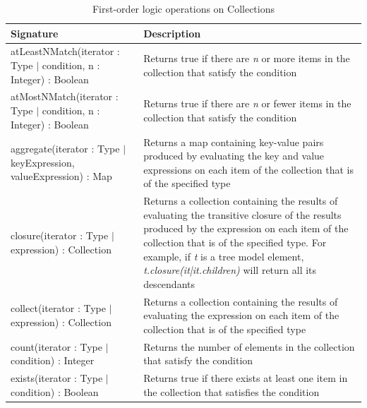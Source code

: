\begin{longtabu} {|p{6.5cm}|X|}
\caption{First-order logic operations on Collections}
\label{tab:FirstOrderOperations}\\
\hline

    \textbf{Signature} & \textbf{Description} \\\hline

	atLeastNMatch(iterator : Type $|$ condition, n : Integer) : Boolean & Returns true if there are \emph{n} or more items in the collection that satisfy the condition \\\hline
	
	atMostNMatch(iterator : Type $|$ condition, n : Integer) : Boolean & Returns true if there are \emph{n} or fewer items in the collection that satisfy the condition \\\hline

    aggregate(iterator : Type $|$ keyExpression, valueExpression) : Map & Returns a map containing key-value pairs produced by evaluating the key and value expressions on each item of the collection that is of the specified type \\\hline
    
    closure(iterator : Type $|$ expression) : Collection & Returns a collection containing the results of evaluating the transitive closure of the results produced by the expression on each item of the collection that is of the specified type. For example, if \emph{t} is a tree model element, \emph{t.closure(it|it.children)} will return all its descendants \\\hline
    
    collect(iterator : Type $|$ expression) : Collection &  Returns a collection containing the results of evaluating the expression on each item of the collection that is of the specified type \\\hline
    
    count(iterator : Type $|$ condition) : Integer & Returns the number of elements in the collection that satisfy the condition \\\hline
    
    exists(iterator : Type $|$ condition) : Boolean & Returns true if there exists at least one item in the collection that satisfies the condition \\\hline
    

\end{longtabu}
